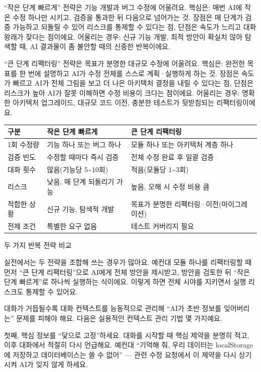 “작은 단계 빠르게” 전략은 기능 개발과 버그 수정에 어울려요. 핵심은: 매번 AI에 작은 수정 하나만 시키고, 검증을 통과한 뒤 다음으로 넘어가는 것. 장점은 매 단계가 검증 가능하고 되돌릴 수 있어 리스크를 통제할 수 있다는 점, 단점은 속도가 느리고 대화 왕래가 잦다는 점이에요. 어울리는 경우: 신규 기능 개발, 최적 방안이 확실치 않아 탐색할 때, AI 결과물이 좀 불안할 때의 신중한 반복이에요.

“큰 단계 리팩터링” 전략은 목표가 분명한 대규모 수정에 어울려요. 핵심은: 완전한 목표를 한 번에 설명하고 AI가 수정 전체를 스스로 계획·실행하게 하는 것. 장점은 속도가 빠르고 AI가 전체 그림을 보고 더 나은 아키텍처 결정을 내릴 수 있다는 점, 단점은 리스크가 높아 AI가 잘못 이해하면 수정 비용이 크다는 점이에요. 어울리는 경우: 명확한 아키텍처 업그레이드, 대규모 코드 이전, 충분한 테스트가 뒷받침되는 리팩터링이에요.

\begin{center}
\begin{tabularx}{\linewidth}{|X|X|X|}
\hline
\textbf{구분} & \textbf{작은 단계 빠르게} & \textbf{큰 단계 리팩터링} \tabularnewline
\hline
1회 수정량 & 기능 하나 또는 버그 하나 & 모듈 하나 또는 아키텍처 계층 하나 \tabularnewline
검증 빈도 & 수정할 때마다 즉시 검증 & 전체 수정 완료 후 일괄 검증 \tabularnewline
대화 횟수 & 많음(기능당 5\textasciitilde{}10회) & 적음(모듈당 1\textasciitilde{}3회) \tabularnewline
리스크 & 낮음, 매 단계 되돌리기 가능 & 높음, 오해 시 수정 비용 큼 \tabularnewline
적합한 상황 & 신규 기능, 탐색적 개발 & 목표가 분명한 리팩터링·이전(마이그레이션) \tabularnewline
전제 조건 & 특별한 요구 없음 & 테스트 커버리지 필요 \tabularnewline
\hline
\end{tabularx}
\end{center}

\begin{center}\small\color{gray}두 가지 반복 전략 비교\end{center}

실전에서는 두 전략을 조합해 쓰는 경우가 많아요. 예컨대 모듈 하나를 리팩터링할 때 먼저 “큰 단계 리팩터링”으로 AI에게 전체 방안을 제시받고, 방안을 검토한 뒤 “작은 단계 빠르게”로 하나씩 실행하는 식이에요. 이렇게 하면 전체 시야를 지키면서 실행 리스크도 통제할 수 있어요.


대화가 거듭될수록 대화 컨텍스트를 능동적으로 관리해 “AI가 초반 정보를 잊어버리는” 문제를 피해야 해요. 다음은 실용적인 컨텍스트 관리 기법 몇 가지예요.

첫째, 핵심 정보를 “닻으로 고정”하세요. 대화를 시작할 때 핵심 제약을 분명히 적고, 이후 대화에서 적절히 다시 언급해요. 예컨대 “기억해 줘, 우리 데이터는 localStorage에 저장하고 데이터베이스는 쓸 수 없어” — 관련 수정 요청에서 이 제약을 다시 상기시켜 AI가 잊지 않게 하세요.


